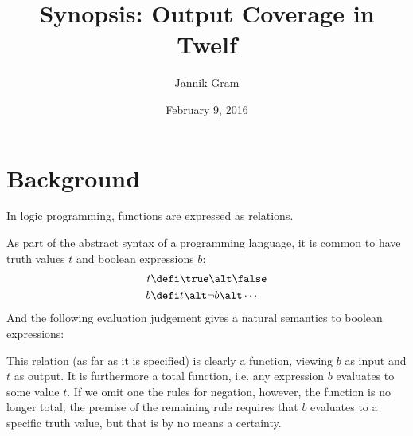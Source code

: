 \documentclass[12pt]{article}
\begin{document}
\title{Synopsis: Output Coverage in Twelf}
\author{Jannik Gram}
\date{February 9, 2016}

\maketitle

\section*{Background}

In logic programming, functions are expressed as relations.

As part of the abstract syntax of a programming language, it is common to have truth values $t$ and boolean expressions $b$:
\begin{align*}
  t &\defi \true \alt \false \\
  b &\defi t \alt \neg{b} \alt \cdots
\end{align*}
And the following evaluation judgement gives a natural semantics to boolean expressions:

{ %
\vspace{0.5cm}
\noindent {}

\begin{prooftree}
\end{prooftree}

\begin{prooftree}
\end{prooftree}

\begin{prooftree}
\end{prooftree}

\centering{$\vdots$}

\vspace{0.5cm}
}

This relation (as far as it is specified) is clearly a function, viewing $b$ as input and $t$ as output.
It is furthermore a total function, i.e. any expression $b$ evaluates to some value $t$.
If we omit one the rules for negation, however, the function is no longer total;
the premise of the remaining rule requires that $b$ evaluates to a specific truth value, but that is by no means a certainty.
\end{document}
